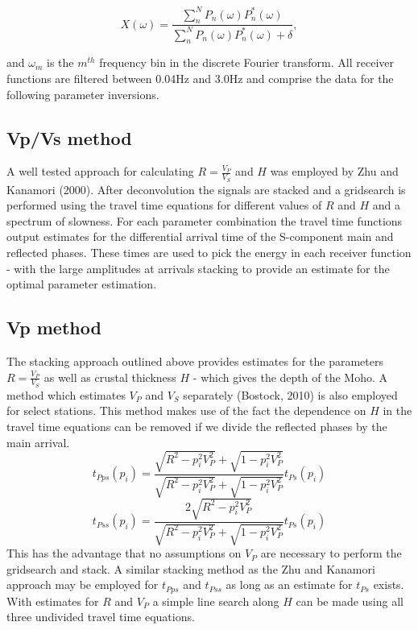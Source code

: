 \documentclass[draft, 12pt]{article}
\begin{document}
\begin{equation}
  X(\omega) = \frac {\sum_n^N P_n(\omega)P_n^*(\omega)} {\sum_n^N P_n(\omega)P_n^*(\omega) + \delta},
\end{equation}

and $\omega_m$ is the $m^{th}$ frequency bin in the discrete Fourier transform. All receiver functions are filtered between 0.04Hz and 3.0Hz and comprise the data for the following parameter inversions.



\subsection{Vp/Vs method}
   A well tested approach for calculating $R=\frac{V_P}{V_S}$ and $H$ was employed by Zhu and Kanamori (2000). After deconvolution the signals are stacked and a gridsearch is performed using the travel time equations for different values of $R$ and $H$ and a spectrum of slowness. For each parameter combination the travel time functions output estimates for the differential arrival time of the S-component main and reflected phases. These times are used to pick the energy in each receiver function - with the large amplitudes at arrivals stacking to provide an estimate for the optimal parameter estimation.

\subsection{Vp method}
   The stacking approach outlined above provides estimates for the parameters $R=\frac{V_P}{V_S}$ as well as crustal thickness $H$ - which gives the depth of the Moho. A method which estimates $V_P$ and $V_S$ separately (Bostock, 2010) is also employed for select stations. This method makes use of the fact the dependence on $H$ in the travel time equations can be removed if we divide the reflected phases by the main arrival.
$$ t_{Pps}(p_i) = \frac{ \sqrt{R^2-p_i^2V_P^2} + \sqrt{1-p_i^2V_P^2} } {\sqrt{R^2-p_i^2V_P^2} + \sqrt{1-p_i^2V_P^2} } t_{Ps}(p_i) $$
$$ t_{Pss}(p_i) = \frac{2\sqrt{R^2-p_i^2V_P^2}} {\sqrt{R^2-p_i^2V_P^2} + \sqrt{1-p_i^2V_P^2} } t_{Ps}(p_i) $$
This has the advantage that no assumptions on $V_P$ are necessary to perform the gridsearch and stack. A similar stacking method as the Zhu and Kanamori approach may be employed for $t_{Pps}$ and $t_{Pss}$ as long as an estimate for $t_{Ps}$ exists. With estimates for $R$ and $V_P$ a simple line search along $H$ can be made using all three undivided travel time equations.
\end{document}
